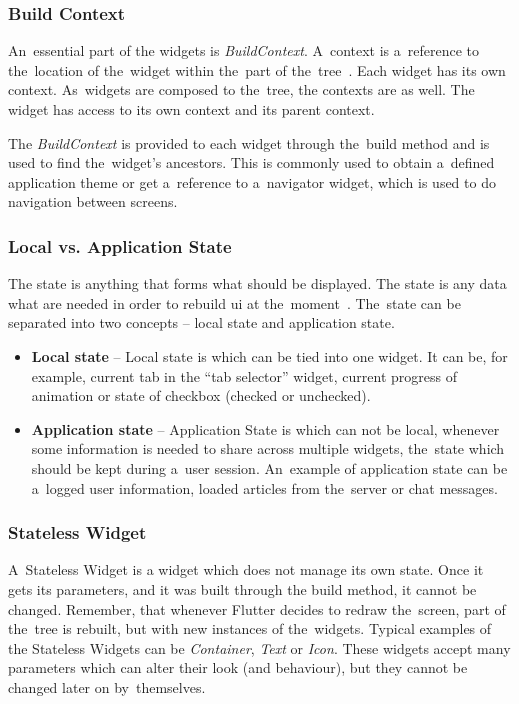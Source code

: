 \subsubsection{Build Context}
An~essential part of the widgets is \textit{BuildContext}. A~context is a~reference to the~location of the~widget within the~part of the~tree~\cite{notion-widget-didier}. Each widget has its own context. As~widgets are composed to the~tree, the contexts are as well. The widget has access to its own context and its parent context. 

The \textit{BuildContext} is provided to each widget through the~build method and is used to find the~widget's ancestors.  This is commonly used to obtain a~defined application theme or get a~reference to a~navigator widget, which is used to do navigation between screens. 
\subsubsection{Local vs. Application State}
The state is anything that forms what should be displayed. The state is any data what are needed in order to rebuild \gls{ui} at the~moment~\cite{flutter-local-app-state}. The~state can be separated into two concepts -- local state and application state. 

\begin{itemize}
    \item \textbf{Local state} -- Local state is which can be tied into one widget. It can be, for example, current tab in the ``tab selector'' widget, current progress of animation or state of checkbox (checked or unchecked).
    \item \textbf{Application state} -- Application State is which can not be local, whenever some information is needed to share across multiple widgets, the~state which should be kept during a~user session. An~example of application state can be a~logged user information, loaded articles from the~server or chat messages.
\end{itemize}
\subsubsection{Stateless Widget}
A~Stateless Widget is a widget which does not manage its own state. Once it gets its parameters, and it was built through the build method, it cannot be changed. Remember, that whenever Flutter decides to redraw the~screen, part of the~tree is rebuilt, but with new instances of the~widgets. Typical examples of the Stateless Widgets can be \textit{Container}, \textit{Text} or \textit{Icon}. These widgets accept many parameters which can alter their look (and behaviour), but they cannot be changed later on by~themselves. 

